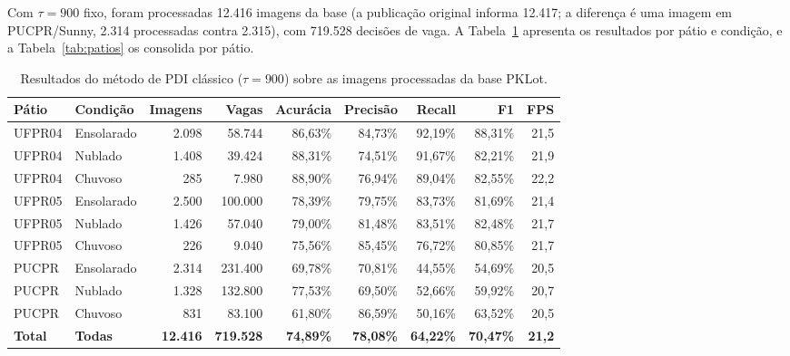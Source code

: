 \documentclass[
	article,			%
	11pt,				%
	oneside,			%
	a4paper,			%
	english,			%
	brazil,				%
	sumario=tradicional
	]{abntex2}
\begin{document}
Com $\tau=900$ fixo, foram processadas 12.416 imagens da base (a publicação original informa 12.417; a diferença é uma imagem em PUCPR/Sunny, 2.314 processadas contra 2.315), com 719.528 decisões de vaga. A Tabela~\ref{tab:benchmark} apresenta os resultados por pátio e condição, e a Tabela~\ref{tab:patios} os consolida por pátio.

\begin{table}[htbp]
\centering
\caption{Resultados do método de PDI clássico ($\tau=900$) sobre as imagens processadas da base PKLot.}
\label{tab:benchmark}
\footnotesize
\setlength{\tabcolsep}{3pt}
\begin{tabular}{llrrrrrrr}
\toprule
\textbf{Pátio} & \textbf{Condição} & \textbf{Imagens} & \textbf{Vagas} & \textbf{Acurácia} & \textbf{Precisão} & \textbf{Recall} & \textbf{F1} & \textbf{FPS} \\
\midrule
UFPR04 & Ensolarado & 2.098 & 58.744  & 86,63\% & 84,73\% & 92,19\% & 88,31\% & 21,5 \\
UFPR04 & Nublado    & 1.408 & 39.424  & 88,31\% & 74,51\% & 91,67\% & 82,21\% & 21,9 \\
UFPR04 & Chuvoso    & 285   & 7.980   & 88,90\% & 76,94\% & 89,04\% & 82,55\% & 22,2 \\
UFPR05 & Ensolarado & 2.500 & 100.000 & 78,39\% & 79,75\% & 83,73\% & 81,69\% & 21,4 \\
UFPR05 & Nublado    & 1.426 & 57.040  & 79,00\% & 81,48\% & 83,51\% & 82,48\% & 21,7 \\
UFPR05 & Chuvoso    & 226   & 9.040   & 75,56\% & 85,45\% & 76,72\% & 80,85\% & 21,7 \\
PUCPR  & Ensolarado & 2.314 & 231.400 & 69,78\% & 70,81\% & 44,55\% & 54,69\% & 20,5 \\
PUCPR  & Nublado    & 1.328 & 132.800 & 77,53\% & 69,50\% & 52,66\% & 59,92\% & 20,7 \\
PUCPR  & Chuvoso    & 831   & 83.100  & 61,80\% & 86,59\% & 50,16\% & 63,52\% & 20,5 \\
\midrule
\textbf{Total} & \textbf{Todas} & \textbf{12.416} & \textbf{719.528} & \textbf{74,89\%} & \textbf{78,08\%} & \textbf{64,22\%} & \textbf{70,47\%} & \textbf{21,2} \\
\bottomrule
\end{tabular}
\end{table}
\end{document}
